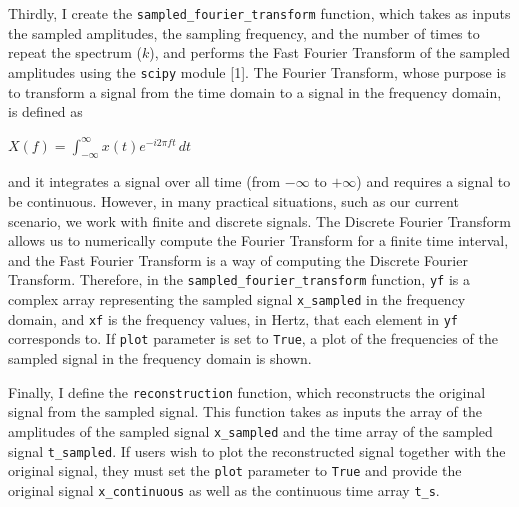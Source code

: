 \documentclass{article}
\begin{document}
Thirdly, I create the \verb|sampled_fourier_transform| function, which takes as inputs the sampled amplitudes, the sampling frequency, and the number of times to repeat the spectrum ($k$), 
and performs the Fast Fourier Transform of the sampled amplitudes using the \verb|scipy| module [1].
The Fourier Transform, whose purpose is to transform a signal from the time domain to a signal in the frequency domain, is defined as
\begin{center}
    \begin{math}
       X(f) = \displaystyle \int_{-\infty}^{\infty} x(t)e^{-i2\pi ft}\, dt
    \end{math}
\end{center}
and it integrates a signal over all time (from $-\infty$ to $+\infty$) and requires a signal to be continuous. 
However, in many practical situations, such as our current scenario, we work with finite and discrete signals. 
The Discrete Fourier Transform allows us to numerically compute the Fourier Transform for a finite time interval, 
and the Fast Fourier Transform is a way of computing the Discrete Fourier Transform. 
Therefore, in the \verb|sampled_fourier_transform| function, \verb|yf| is a complex array representing the sampled signal \verb|x_sampled| in the frequency domain, 
and \verb|xf| is the frequency values, in Hertz, that each element in \verb|yf| corresponds to.
If \verb|plot| parameter is set to \verb|True|, a plot of the frequencies of the sampled signal in the frequency domain is shown.

Finally, I define the \verb|reconstruction| function, which reconstructs the original signal from the sampled signal.
This function takes as inputs the array of the amplitudes of the sampled signal \verb|x_sampled| and the time array of the sampled signal \verb|t_sampled|.
If users wish to plot the reconstructed signal together with the original signal, they must set the \verb|plot| parameter to \verb|True| and provide the original signal \verb|x_continuous| as well as the continuous time array \verb|t_s|.
\end{document}
